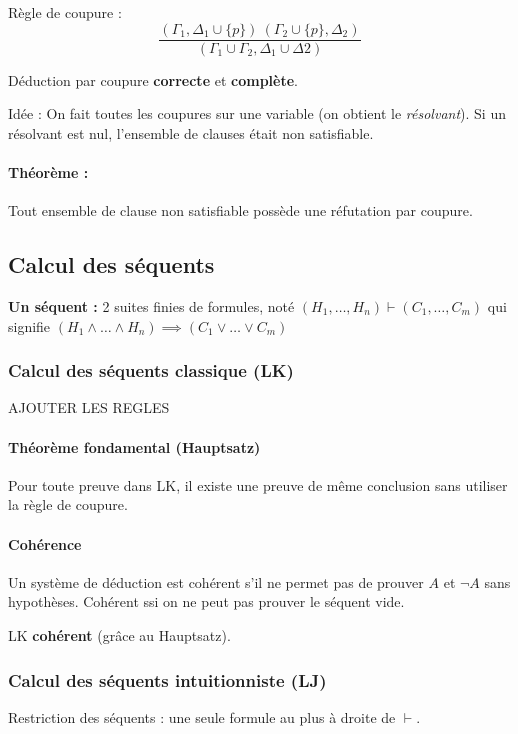 \documentclass[french]{article}
\begin{document}
Règle de coupure :
$$\dfrac{(\Gamma_1,\Delta_1\cup\{p\})\ (\Gamma_2\cup\{p\}, \Delta_2)}{(\Gamma_1\cup\Gamma_2, \Delta_1\cup\Delta2)}$$

Déduction par coupure \textbf{correcte} et \textbf{complète}.

Idée : On fait toutes les coupures sur une variable (on obtient le \emph{résolvant}). Si un résolvant est nul, l'ensemble de clauses était non satisfiable.

\paragraph{Théorème :} Tout ensemble de clause non satisfiable possède une réfutation par coupure.

\subsection{Calcul des séquents}
\textbf{Un séquent :} 2 suites finies de formules, noté  $(H_1,\dots , H_n)\vdash (C_1,\dots , C_m)$ qui signifie $(H_1\wedge\dots\wedge H_n)\implies (C_1\vee\dots\vee C_m)$

\subsubsection{Calcul des séquents classique (LK)}
AJOUTER LES REGLES

\paragraph{Théorème fondamental (Hauptsatz)}
Pour toute preuve dans LK, il existe une preuve de même conclusion sans utiliser la règle de coupure.

\paragraph{Cohérence} Un système de déduction est cohérent s'il ne permet pas de prouver $A$ et $\neg A$ sans hypothèses. Cohérent ssi on ne peut pas prouver le séquent vide.

LK \textbf{cohérent} (grâce au Hauptsatz).

\subsubsection{Calcul des séquents intuitionniste (LJ)}
Restriction des séquents : une seule formule au plus à droite de $\vdash$.
\end{document}
